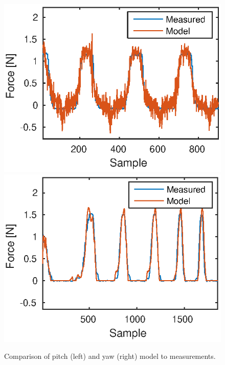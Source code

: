  \begin{figure}[H]
 \centering
\includegraphics[width=0.49\linewidth]{modelpitch2_a}
\includegraphics[width=0.49\linewidth]{modelyaw_a}
\caption{Comparison of pitch (left) and yaw (right) model to measurements.}
\label{fig:final_res_yaw}
\end{figure}



